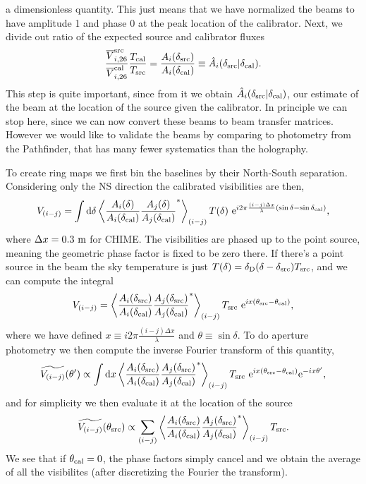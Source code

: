 a dimensionless quantity. This just means that we have normalized the beams to have amplitude 1 and phase 0 at the peak location of the calibrator. Next, we divide out ratio of the expected source and calibrator fluxes
\begin{align}
\frac{\overline{V}^{\rm src}_{i,{\rm 26}}}{\overline{V}^{\rm cal}_{i,{\rm 26}}} \frac{T_{\rm cal}}{T_{\rm src}} = \frac{A_i(\delta_{\rm src})}{A_i(\delta_{\rm cal})}\equiv \hat{A}_i(\delta_{\rm src} | \delta_{\rm cal}).
\end{align}
This step is quite important, since from it we obtain $\hat{A}_i(\delta_{\rm src} | \delta_{\rm cal})$, our estimate of the beam at the location of the source given the calibrator. In principle we can stop here, since we can now convert these beams to beam transfer matrices. However we would like to validate the beams by comparing to photometry from the Pathfinder, that has many fewer systematics than the holography. 

To create ring maps we first bin the baselines by their North-South separation. Considering only the NS direction the calibrated visibilities are then,
\begin{align}
V_{(i-j)} = \int {\rm d} \delta \left\langle \frac{A_i(\delta)}{A_i(\delta_{\rm cal})} \frac{A_j(\delta)}{A_j(\delta_{\rm cal})}^* \right\rangle_{(i-j)} T(\delta) ~ {\rm e}^{i2\pi \frac{(i-j) \Delta x}{\lambda}(\sin{\delta} - \sin{\delta_{\rm cal}})}, 
\end{align}
where $\Delta x = 0.3~{\rm m}$ for CHIME. The visibilities are phased up to the point source, meaning the geometric phase factor is fixed to be zero there. If there's a point source in the beam the sky temperature is just $T(\delta) = \delta_{\rm D}(\delta - \delta_{\rm src}) T_{\rm src}$, and we can compute the integral
\begin{align}
V_{(i-j)} = \left\langle \frac{A_i(\delta_{\rm src})}{A_i(\delta_{\rm cal})} \frac{A_j(\delta_{\rm src})}{A_j(\delta_{\rm cal})}^* \right\rangle_{(i-j)} T_{\rm src} ~ {\rm e}^{ix(\theta_{\rm src} - \theta_{\rm cal})},
\end{align}
where we have defined $x \equiv i2\pi \frac{(i-j) \Delta x}{\lambda}$ and $\theta \equiv \sin{\delta}$. To do aperture photometry we then compute the inverse Fourier transform of this quantity,
\begin{align}
\widetilde{V_{(i-j)}}(\theta') \propto \int {\rm d} x \left\langle \frac{A_i(\delta_{\rm src})}{A_i(\delta_{\rm cal})} \frac{A_j(\delta_{\rm src})}{A_j(\delta_{\rm cal})}^* \right\rangle_{(i-j)} T_{\rm src} ~ {\rm e}^{ix(\theta_{\rm src} - \theta_{\rm cal})} {\rm e}^{-ix\theta'},
\end{align}
and for simplicity we then evaluate it at the location of the source
\begin{align}
\widetilde{V_{(i-j)}}(\theta_{\rm src}) \propto \sum_{(i-j)} \left\langle \frac{A_i(\delta_{\rm src})}{A_i(\delta_{\rm cal})} \frac{A_j(\delta_{\rm src})}{A_j(\delta_{\rm cal})}^* \right\rangle_{(i-j)} T_{\rm src}. \label{photometry}
\end{align}
We see that if $\theta_{\rm cal} = 0$, the phase factors simply cancel and we obtain the average of all the visibilites (after discretizing the Fourier the transform).

